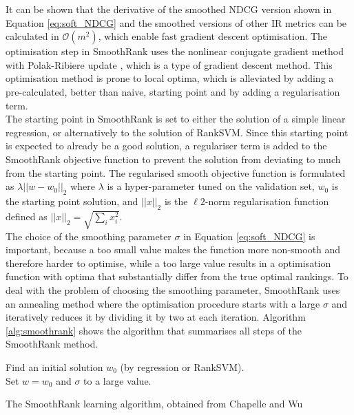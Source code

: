 It can be shown that the derivative of the smoothed \ac{NDCG} version shown in Equation \ref{eq:soft_NDCG} and the smoothed versions of other \ac{IR} metrics can be calculated in $\mathcal{O}(m^2)$, which enable fast gradient descent optimisation. The optimisation step in SmoothRank uses the nonlinear conjugate gradient method  with Polak-Ribiere update \cite{Shewchuk1994}, which is a type of gradient descent method. This optimisation method is prone to local optima, which is alleviated by adding a pre-calculated, better than naive, starting point and by adding a regularisation term.\\

The starting point in SmoothRank is set to either the solution of a simple linear regression, or alternatively to the solution of Rank\acs{SVM}. Since this starting point is expected to already be a good solution, a regulariser term is added to the SmoothRank objective function to prevent the solution from deviating to much from the starting point. The regularised smooth objective function is formulated as $\lambda||w-w_0||_2$ where $\lambda$ is a hyper-parameter tuned on the validation set, $w_0$ is the starting point solution, and $||x||_2$ is the $\ell2$-norm regularisation function defined as $||x||_2 = \sqrt{\sum\nolimits_ix_i^2}$.\\

The choice of the smoothing parameter $\sigma$ in Equation \ref{eq:soft_NDCG} is important, because a too small value makes the function more non-smooth and therefore harder to optimise, while a too large value results in a optimisation function with optima that substantially differ from the true optimal rankings. To deal with the problem of choosing the smoothing parameter, SmoothRank uses an annealing method where the optimisation procedure starts with a large $\sigma$ and iteratively reduces it by dividing it by two at each iteration. Algorithm \ref{alg:smoothrank} shows the algorithm that summarises all steps of the SmoothRank method.\\

\LinesNumbered
\begin{algorithm}[H]
 Find an initial solution $w_0$ (by regression or Rank\acs{SVM}).\\
 Set $w = w_0$ and $\sigma$ to a large value.\\
 \caption{The SmoothRank learning algorithm, obtained from Chapelle and Wu \cite{Chapelle2010}}
 \label{alg:smoothrank}
\end{algorithm}

